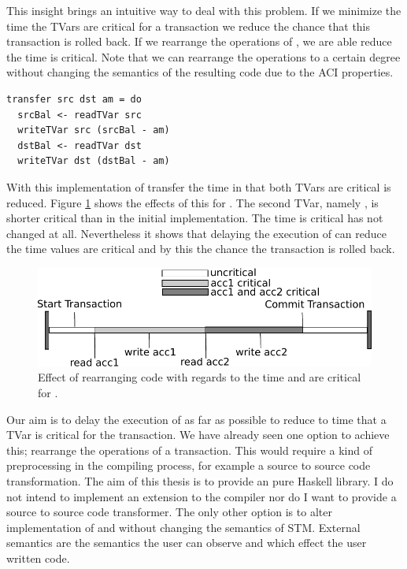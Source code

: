 This insight brings an intuitive way to deal with this problem. If we minimize the time the TVars are critical for
a transaction we reduce the chance that this transaction is rolled back. 
If we rearrange the operations of , we are able reduce the time  is critical. Note that we 
can rearrange the operations to a certain degree without changing the semantics of the resulting code due to the ACI 
properties. 
\begin{lstlisting}
transfer src dst am = do 
  srcBal <- readTVar src
  writeTVar src (srcBal - am)
  dstBal <- readTVar dst
  writeTVar dst (dstBal - am)
\end{lstlisting}
With this implementation of transfer the time in that both TVars are critical is reduced. Figure \ref{fig:criticalValue2}
shows the effects of this for . The second TVar, namely , is shorter critical than in the 
initial implementation. The time  is critical has not changed at all. Nevertheless it shows that delaying the
execution of  can reduce the time values are critical and by this the chance the transaction is rolled back.
\begin{figure}
\centering
\includegraphics{Figures/CriticalValue2}
\decoRule
\caption[CriticalValue2]{Effect of rearranging code with regards to the time  and  are critical for .}
\label{fig:criticalValue2}
\end{figure}
Our aim is to delay the execution of  as far as possible to reduce to time that
a TVar is critical for the transaction. We have already seen one option to achieve this; rearrange the 
operations of a transaction. This would require a kind of preprocessing in the compiling process, for 
example a source to source code transformation. The aim of this thesis is to provide an pure Haskell
library. I do not intend to implement an extension to the compiler nor do I 
want to provide a source to source code transformer. The only other option is to alter implementation
of  and  without changing the  semantics of STM. 
External semantics are the semantics the user can observe and which effect the user written code.

